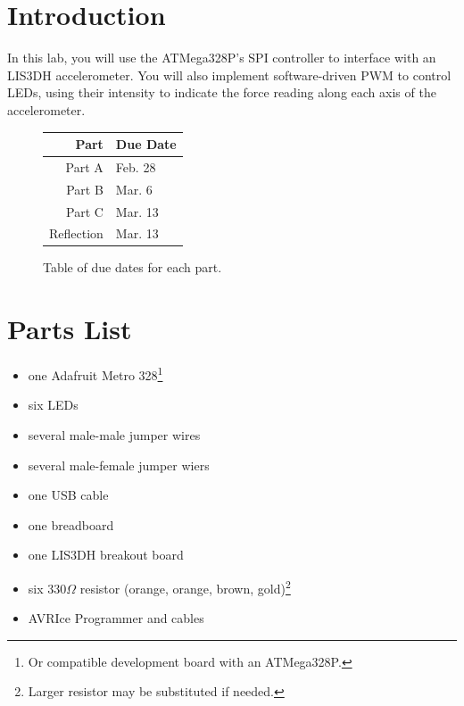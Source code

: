 \documentclass{article}
\begin{document}
\section{Introduction}

In this lab, you will use the ATMega328P's SPI controller to interface with an
LIS3DH accelerometer. You will also implement software-driven PWM to control
LEDs, using their intensity to indicate the force reading along each axis of
the accelerometer.

\begin{figure}[H]

	\centering

	\begin{tabular}{r|l}

		Part & Due Date \\ \hline\hline
		Part A & Feb. 28\\ \hline
		Part B & Mar. 6\\ \hline
		Part C & Mar. 13\\ \hline
		Reflection & Mar. 13\\ \hline

	\end{tabular}

	\caption{Table of due dates for each part.}

\end{figure}

\tableofcontents

\section{Parts List}

\begin{multicols}{2}

\begin{itemize}

\item one Adafruit Metro 328\footnote{Or compatible development board with an ATMega328P.}

\item six LEDs

\item several male-male jumper wires

\item several male-female jumper wiers

\item one USB cable

\item one breadboard

\item one LIS3DH breakout board

\item six 330$\Omega$ resistor (orange, orange, brown, gold)\footnote{Larger
	resistor may be substituted if needed.}

\item AVRIce Programmer and cables

\end{itemize}

\end{multicols}
\end{document}
